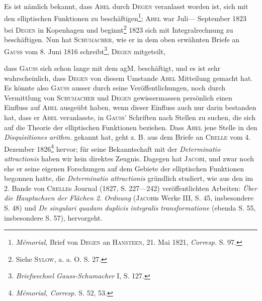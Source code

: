 Es ist nämlich bekannt, dass \textsc{Abel} durch \textsc{Degen} veranlasst worden ist,
sich mit den elliptischen Funktionen zu beschäftigen\footnote{\textit{Mémorial}, Brief von \textsc{Degen} an \textsc{Hansteen}, 21. Mai 1821, \textit{Corresp.} S. 97.}; \textsc{Abel} war Juli—
September 1823 bei \textsc{Degen} in Kopenhagen und beginnt\footnote{Siehe \textsc{Sylow}, a. a. O. S. 27.} 1823 sich mit
Integralrechnung zu beschäftigen. Nun hat \textsc{Schumacher}, wie er in dem oben
erwähnten Briefe an \textsc{Gauss} vom 8. Juni 1816 schreibt\footnote{\textit{Briefwechsel Gauss-Schumacher} I, S. 127.}, \textsc{Degen} mitgeteilt,
\par\clearpage{}
\noindent dass \textsc{Gauss} sich schon lange mit dem agM. beschäftigt, und es ist sehr wahrscheinlich,
dass \textsc{Degen} von diesem Umstande \textsc{Abel} Mitteilung gemacht hat.
Es könnte also \textsc{Gauss} ausser durch seine Veröffentlichungen, noch durch Vermittlung
von \textsc{Schumacher} und \textsc{Degen} gewissermassen persönlich einen Einfluss
auf \textsc{Abel} ausgeübt haben, wenn dieser Einfluss auch nur darin bestanden hat,
dass er \textsc{Abel} veranlasste, in \textsc{Gauss}' Schriften nach Stellen zu suchen, die sich
auf die Theorie der elliptischen Funktionen beziehen. Dass \textsc{Abel} jene Stelle
in den \textit{Disquisitiones arithm.} gekannt hat, geht z. B. aus dem Briefe an \textsc{Crelle}
vom 4. Dezember 1826\footnote{\textit{Mémorial, Corresp.} S. 52, 53.} hervor; für seine Bekanntschaft mit der \textit{Determinatio
attractionis} haben wir kein direktes Zeugnis. Dagegen hat \textsc{Jacobi}, und zwar
noch ehe er seine eigenen Forschungen auf dem Gebiete der elliptischen
Funktionen begonnen hatte, die \textit{Determinatio attractionis} gründlich studiert,
wie aus den im 2. Bande von \textsc{Crelle}s Journal (1827, S. 227—242) veröffentlichten
Arbeiten: \textit{Über die Hauptachsen der Flächen 2. Ordnung} (\textsc{Jacobi}s Werke
III, S. 45, insbesondere S. 48) und \textit{De singulari quadam duplicis integralis transformatione}
(ebenda S. 55, insbesondere S. 57), hervorgeht.

